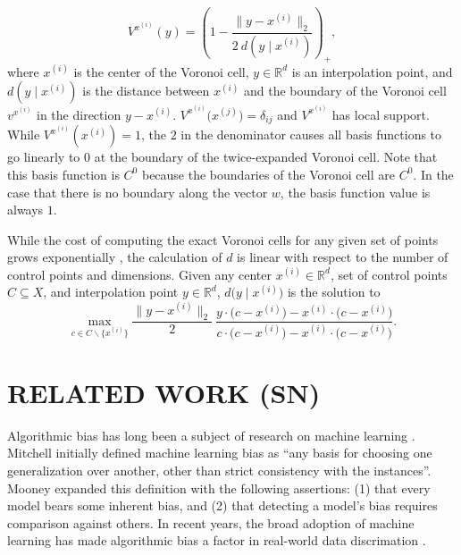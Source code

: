 \documentclass[sigconf]{acmart}
\begin{document}
$$ V^{x^{(i)}}(y) = \left(1 - \frac{\bigl\|y - x^{(i)}\bigr\|_2}{2 \ d(y \mid x^{(i)})} \right)_+, $$
where $x^{(i)}$ is the center of the Voronoi cell, $y \in \mathbb{R}^d$ is an interpolation point, and $d(y \mid x^{(i)})$ is the distance between $x^{(i)}$ and the boundary of the Voronoi cell $v^{x^{(i)}}$ in the direction $y - x^{(i)}$. $V^{x^{(i)}}\bigl(x^{(j)}\bigr) = \delta_{ij}$ and $V^{x^{(i)}}$ has local support. While $V^{x^{(i)}}(x^{(i)}) = 1$, the $2$ in the denominator causes all basis functions to go linearly to $0$ at the boundary of the twice-expanded Voronoi cell. Note that this basis function is $C^0$ because the boundaries of the Voronoi cell are $C^0$. In the case that there is no boundary along the vector $w$, the basis function value is always $1$.

While the cost of computing the exact Voronoi cells for any given set of points grows exponentially \cite{dutour2009complexity}, the calculation of $d$ is linear with respect to the number of control points and dimensions. Given any center $x^{(i)} \in \mathbb{R}^d$, set of control points $C \subseteq X$, and interpolation point $y \in \mathbb{R}^d$, $d\bigl(y \mid x^{(i)}\bigr)$ is the solution to
$$
  \max_{c \in C\backslash\{x^{(i)}\}} \frac{\bigl\|y - x^{(i)}\bigr\|_2}{2} \ \frac{y \cdot \bigl(c - x^{(i)}\bigr) - x^{(i)} \cdot \bigl(c - x^{(i)}\bigr)}{c \cdot \bigl(c - x^{(i)}\bigr) - x^{(i)} \cdot \bigl(c - x^{(i)}\bigr)}.
$$




\section{RELATED WORK (SN)}
\label{sec:related}
Algorithmic bias has long been a subject of research on machine learning \cite{kirkpatrick2016battling, hajian2016algorithmic, baeza2016data}. 
Mitchell \cite{mitchell1980need} initially defined machine learning bias as ``any basis for choosing one generalization over another, other than strict consistency with the instances''.
Mooney \cite{mooney1996comparative} expanded this definition with the following assertions: (1) that every model bears some inherent bias, and (2) that detecting a model's bias requires comparison against others.
In recent years, the broad adoption of machine learning has made algorithmic bias a factor in real-world data discrimation \cite{squires2003racial, stoll2004black, angwinmachine}.
\end{document}
